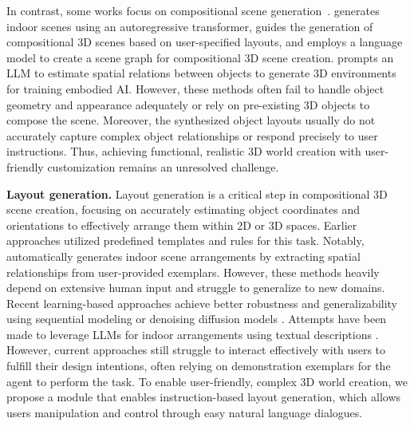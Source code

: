 In contrast, some works focus on compositional scene generation~\cite{zhai2023commonscenes, epsteindisentangled}.
\cite{Paschalidou2021NEURIPS} generates indoor scenes using an autoregressive transformer, \cite{po2024compositional} guides the generation of compositional 3D scenes based on user-specified layouts, and \cite{gao2024graphdreamer} employs a language model to create a scene graph for compositional 3D scene creation. 
\cite{yang2024holodeck} prompts an LLM to estimate spatial relations between objects to generate 3D environments for training embodied AI.
However, these methods often fail to handle object geometry and appearance adequately or rely on pre-existing 3D objects to compose the scene. Moreover, the synthesized object layouts usually do not accurately capture complex object relationships or respond precisely to user instructions. Thus, achieving functional, realistic 3D world creation with user-friendly customization remains an unresolved challenge.


\noindent\textbf{Layout generation.}
Layout generation is a critical step in compositional 3D scene creation, focusing on accurately estimating object coordinates and orientations to effectively arrange them within 2D or 3D spaces. Earlier approaches \cite{kjolaas2000automatic,coyne2001wordseye,germer2009procedural} utilized predefined templates and rules for this task. Notably, \cite{yu2011make} automatically generates indoor scene arrangements by extracting spatial relationships from user-provided exemplars. However, these methods heavily depend on extensive human input and struggle to generalize to new domains. 
Recent learning-based approaches \cite{wang2021sceneformer, Paschalidou2021NEURIPS, para2023cofs} achieve better robustness and generalizability using sequential modeling \cite{sun2025forest2seq} or denoising diffusion models \cite{tang2024diffuscene}.
%
Attempts have been made to leverage LLMs for indoor arrangements using textual descriptions \cite{fu2025anyhome, feng2024layoutgpt}. However, current approaches still struggle to interact effectively with users to fulfill their design intentions, often relying on demonstration exemplars for the agent to perform the task.
%
To enable %
user-friendly, complex 3D world creation, we propose a module that enables instruction-based layout generation, which allows users manipulation and control through easy natural language dialogues.





